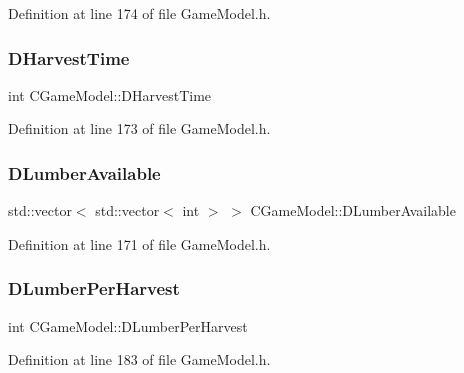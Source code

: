 Definition at line 174 of file Game\+Model.\+h.

\hypertarget{classCGameModel_a0160295e3cf06b7bbcb9247bc49e3156}{}\label{classCGameModel_a0160295e3cf06b7bbcb9247bc49e3156} 
\subsubsection{\texorpdfstring{D\+Harvest\+Time}{DHarvestTime}}
{\footnotesize\ttfamily int C\+Game\+Model\+::\+D\+Harvest\+Time\hspace{0.3cm}{\ttfamily [protected]}}



Definition at line 173 of file Game\+Model.\+h.

\hypertarget{classCGameModel_ae0bad49626fc5b7bdf8b3fe6a4187462}{}\label{classCGameModel_ae0bad49626fc5b7bdf8b3fe6a4187462} 
\subsubsection{\texorpdfstring{D\+Lumber\+Available}{DLumberAvailable}}
{\footnotesize\ttfamily std\+::vector$<$ std\+::vector$<$ int $>$ $>$ C\+Game\+Model\+::\+D\+Lumber\+Available\hspace{0.3cm}{\ttfamily [protected]}}



Definition at line 171 of file Game\+Model.\+h.

\hypertarget{classCGameModel_abfa4628f678b64ecfefb9f56150d906f}{}\label{classCGameModel_abfa4628f678b64ecfefb9f56150d906f} 
\subsubsection{\texorpdfstring{D\+Lumber\+Per\+Harvest}{DLumberPerHarvest}}
{\footnotesize\ttfamily int C\+Game\+Model\+::\+D\+Lumber\+Per\+Harvest\hspace{0.3cm}{\ttfamily [protected]}}



Definition at line 183 of file Game\+Model.\+h.

